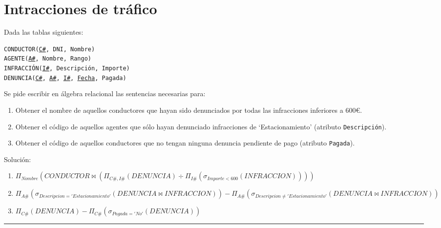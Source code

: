 \documentclass[a4paper]{article}
\begin{document}
\section{Intracciones de tráfico}

Dada las tablas siguientes:

\begin{addmargin}[1.5em]{0em}
    \texttt{CONDUCTOR(\underline{C\#}, DNI, Nombre)}\\
    \texttt{AGENTE(\underline{A\#}, Nombre, Rango)}\\
    \texttt{INFRACCIÓN(\underline{I\#}, Descripción, Importe)}\\
    \texttt{DENUNCIA(\underline{C\#}, \underline{A\#}, \underline{I\#}, \underline{Fecha}, Pagada)}
\end{addmargin}

Se pide escribir en álgebra relacional las sentencias necesarias para:

\begin{enumerate}
    \item Obtener el nombre de aquellos conductores que hayan sido denunciados por todas las infracciones inferiores a 600€.
    \item Obtener el código de aquellos agentes que sólo hayan denunciado infracciones de `Estacionamiento' (atributo \texttt{Descripción}).
    \item Obtener el código de aquellos conductores que no tengan ninguna denuncia pendiente de pago (atributo \texttt{Pagada}).
\end{enumerate}

\begin{solution}
    Solución:

    \begin{enumerate}
        \item $\Pi_{Nombre} \left( CONDUCTOR \bowtie \left( \Pi_{C\#,I\#} \left( DENUNCIA \right) \div \Pi_{I\#} \left( \sigma_{Importe<600} \left( INFRACCION \right) \right) \right) \right)$
        \item $\Pi_{A\#} \left( \sigma_{Descripcion='Estacionamiento'} \left( DENUNCIA \bowtie INFRACCION \right) \right) - \Pi_{A\#} \left( \sigma_{Descripcion \neq 'Estacionamiento'} \left( DENUNCIA \bowtie INFRACCION \right) \right)$
        \item $\Pi_{C\#} \left( DENUNCIA \right) - \Pi_{C\#} \left( \sigma_{Pagada='No'} \left( DENUNCIA \right) \right)$
    \end{enumerate}
\end{solution}

\noindent\rule{\textwidth}{1pt}
\doclicenseThis
\end{document}
